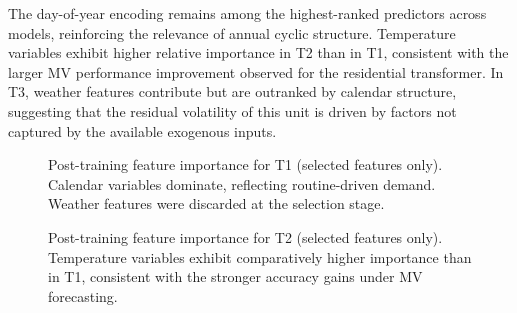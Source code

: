 The day-of-year encoding remains among the highest-ranked predictors across models, reinforcing the relevance of annual cyclic structure. Temperature variables exhibit higher relative importance in T2 than in T1, consistent with the larger MV performance improvement observed for the residential transformer. In T3, weather features contribute but are outranked by calendar structure, suggesting that the residual volatility of this unit is driven by factors not captured by the available exogenous inputs.

\begin{figure}[t]
\centering
\begin{subfigure}[t]{0.32\textwidth}
    \centering
    
\end{subfigure}
\begin{subfigure}[t]{0.32\textwidth}
    \centering
    
\end{subfigure}
\begin{subfigure}[t]{0.32\textwidth}
    \centering
    
\end{subfigure}
\caption{Post-training feature importance for T1 (selected features only). Calendar variables dominate, reflecting routine-driven demand. Weather features were discarded at the selection stage.}
\label{fig:importance_T21a}
\end{figure}

\begin{figure}[t]
\centering
\begin{subfigure}[t]{0.32\textwidth}
    \centering
    
\end{subfigure}
\begin{subfigure}[t]{0.32\textwidth}
    \centering
    
\end{subfigure}
\begin{subfigure}[t]{0.32\textwidth}
    \centering
    
\end{subfigure}
\caption{Post-training feature importance for T2 (selected features only). Temperature variables exhibit comparatively higher importance than in T1, consistent with the stronger accuracy gains under MV forecasting.}
\label{fig:importance_T22a}
\end{figure}

